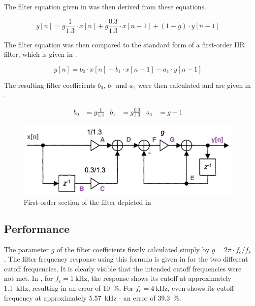 \documentclass[a4paper, 12pt]{article}
\begin{document}
The filter equation given in   was then derived from these equations.

\begin{equation}
	\label{eq:filter}
	y[n] = g \frac{1}{1.3} \cdot x[n] +
	g \frac{0.3}{1.3} \cdot x[n-1] +
	(1-g) \cdot y[n-1]
\end{equation}

The filter equation was then compared to the standard form of a first-order IIR filter, which is given in .

\begin{equation}
	\label{eq:first-order-iir}
	y[n] = b_0 \cdot x[n] + 
	b_1 \cdot x[n-1] - 
	a_1 \cdot y[n-1]
\end{equation}

The resulting filter coefficients $b_0$, $b_1$ and $a_1$ were then calculated and are given in .

\begin{align}
	\label{eq:coefficients}
	b_0 &= g \frac{1}{1.3} &
	b_1 &= g \frac{0.3}{1.3} &
	a_1 &= g - 1
\end{align}

\begin{figure}
	\centering
	\includegraphics[width=\textwidth]{first-order-section.jpg}
	\caption{First-order section of the filter depicted in  \cite{Vaelimaeki2006}}
	\label{fig:first-order-section}
\end{figure}

\subsection{Performance}

The parameter $g$ of the filter coefficients firstly calculated simply by $g = 2 \pi \cdot f_c / f_s$. The filter frequency response using this formula is given in  for the two different cutoff frequencies. It is clearly visible that the intended cutoff frequencies were not met. In , for $f_c = \SI{1}{\kilo\hertz}$, the response shows its cutoff at approximately \SI{1.1}{\kilo\hertz}, resulting in an error of \SI{10}{\percent}. For $f_c = \SI{4}{\kilo\hertz}$,  even shows its cutoff frequency at approximately \SI{5.57}{\kilo\hertz} - an error of \SI{39.3}{\percent}.
\end{document}
